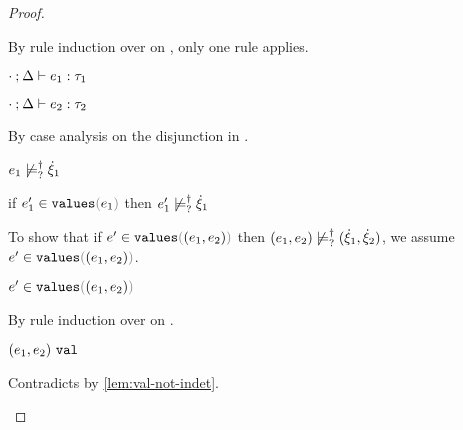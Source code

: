 \begin{proof}
\begin{byCases}
\begin{byCases}
\begin{pfsteps*}
      \end{pfsteps*}
      By rule induction over  on , only one rule applies.
      \begin{byCases}
        \item[\text{(\ref{rule:TPair})}]
        \begin{pfsteps*}
        \item $\cdot \mathbin{;} \Delta \vdash e_1 : \tau_1$  
        \item $\cdot \mathbin{;} \Delta \vdash e_2 : \tau_2$  
        \end{pfsteps*} 
        By case analysis on the disjunction in .
        \begin{byCases}
          \item[\cnotsatisfyormay{e_1}{\hxi_1}]
          \begin{pfsteps*}
          \item $e_1 \not\models_{?}^{\dag} \dot{\xi}_1$  
          \item if $\inValues{e_1'}{e_1}$ then $e_1' \not\models_{?}^{\dag} \dot{\xi}_1$  
          \end{pfsteps*}
          To show that if $\inValues{e'}{\hpair{e_1}{e_2}}$ then $(e_1 , e_2) \not\models_{?}^{\dag} (\dot{\xi}_1 , \dot{\xi}_2)$, we assume $\inValues{e'}{\hpair{e_1}{e_2}}$.
          \begin{pfsteps*}
          \item $\inValues{e'}{\hpair{e_1}{e_2}}$  
          \end{pfsteps*}
          By rule induction over  on .
          \begin{byCases}
            \item[\text{(\ref{rule:IVVal})}]
            \begin{pfsteps*}
            \item $(e_1 , e_2) ~\mathtt{val}$ 
            \end{pfsteps*} 
            Contradicts  by \autoref{lem:val-not-indet}.
            \item[\text{(\ref{rule:IVIndet})}] 

\end{byCases}
\end{byCases}
\end{byCases}
\end{byCases}
\end{byCases}
\end{proof}
